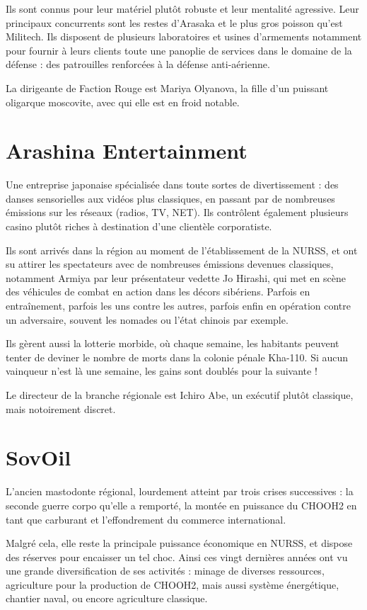 \documentclass[10pt,a4paper]{book}
\begin{document}
Ils sont connus pour leur matériel plutôt robuste et leur mentalité agressive. Leur principaux concurrents sont les restes d'Arasaka et le plus gros poisson qu'est Militech. Ils disposent de plusieurs laboratoires et usines d'armements notamment pour fournir à leurs clients toute une panoplie de services dans le domaine de la défense : des patrouilles renforcées à la défense anti-aérienne.

La dirigeante de Faction Rouge est Mariya Olyanova, la fille d'un puissant oligarque moscovite, avec qui elle est en froid notable.
\section{Arashina Entertainment}
Une entreprise japonaise spécialisée dans toute sortes  de divertissement : des danses sensorielles aux vidéos plus classiques, en passant par de nombreuses émissions sur les réseaux (radios, TV, NET). Ils contrôlent également plusieurs casino plutôt riches à destination d'une clientèle corporatiste.

Ils sont arrivés dans la région au moment de l'établissement de la NURSS, et ont su attirer les spectateurs avec de nombreuses émissions devenues classiques, notamment Armiya par leur présentateur vedette Jo Hirashi, qui met en scène des véhicules de combat en action dans les décors sibériens. Parfois en entraînement, parfois les uns contre les autres, parfois enfin en opération contre un adversaire, souvent les nomades ou l'état chinois par exemple.

Ils gèrent aussi la lotterie morbide, où chaque semaine, les habitants peuvent tenter de deviner le nombre de morts dans la colonie pénale Kha-110. Si aucun vainqueur n'est là une semaine, les gains sont doublés pour la suivante !

Le directeur de la branche régionale est Ichiro Abe, un exécutif plutôt classique, mais notoirement discret.
\section{SovOil}
L'ancien mastodonte régional, lourdement atteint par trois crises successives : la seconde guerre corpo qu'elle a remporté, la montée en puissance du CHOOH2 en tant que carburant et l'effondrement du commerce international.

Malgré cela, elle reste la principale puissance économique en NURSS, et dispose des réserves pour encaisser un tel choc. Ainsi ces vingt dernières années ont vu une grande diversification de ses activités : minage de diverses ressources, agriculture pour la production de CHOOH2, mais aussi système énergétique, chantier naval, ou encore agriculture classique.
\end{document}
